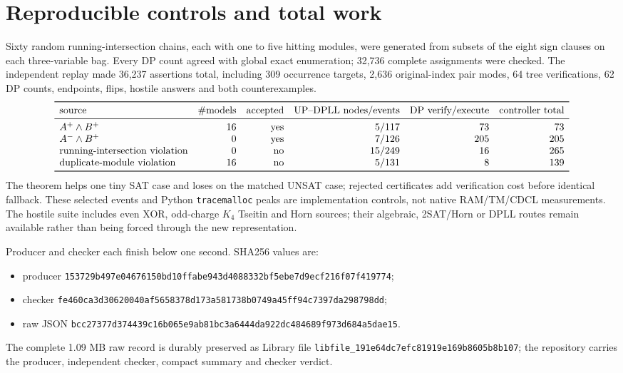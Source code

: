 \documentclass[11pt]{article}
\begin{document}
\section{Reproducible controls and total work}
Sixty random running-intersection chains, each with one to five hitting modules,
were generated from subsets of the eight sign clauses on each three-variable bag.
Every DP count agreed with global exact enumeration; 32,736 complete assignments
were checked.  The independent replay made 36,237 assertions total, including 309
occurrence targets, 2,636 original-index pair modes, 64 tree verifications, 62 DP
counts, endpoints, flips, hostile answers and both counterexamples.
\[
\begin{array}{lrrrrr}\toprule
\text{source}&\#\text{models}&\text{accepted}&\text{UP--DPLL nodes/events}&
\text{DP verify/execute}&\text{controller total}\\\midrule
A^+\wedge B^+&16&\text{yes}&5/117&73&73\\
A^-\wedge B^+&0&\text{yes}&7/126&205&205\\
\text{running-intersection violation}&0&\text{no}&15/249&16&265\\
\text{duplicate-module violation}&16&\text{no}&5/131&8&139\\\bottomrule
\end{array}
\]
The theorem helps one tiny SAT case and loses on the matched UNSAT case; rejected
certificates add verification cost before identical fallback.  These selected
events and Python \texttt{tracemalloc} peaks are implementation controls, not
native RAM/TM/CDCL measurements.  The hostile suite includes even XOR, odd-charge
$K_4$ Tseitin and Horn sources; their algebraic, 2SAT/Horn or DPLL routes remain
available rather than being forced through the new representation.

Producer and checker each finish below one second.  SHA256 values are:
\begin{itemize}
\item producer \texttt{153729b497e04676150bd10ffabe943d4088332bf5ebe7d9ecf216f07f419774};
\item checker \texttt{fe460ca3d30620040af5658378d173a581738b0749a45ff94c7397da298798dd};
\item raw JSON \texttt{bcc27377d374439c16b065e9ab81bc3a6444da922dc484689f973d684a5dae15}.
\end{itemize}
The complete 1.09 MB raw record is durably preserved as Library file
\texttt{libfile\_191e64dc7efc81919e169b8605b8b107}; the repository carries the
producer, independent checker, compact summary and checker verdict.
\end{document}
